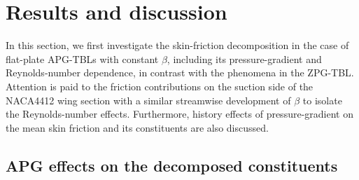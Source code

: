 


%
%

\section{Results and discussion}\label{result}
In this section, we first investigate the skin-friction decomposition in the case of  flat-plate APG-TBLs with constant $\beta$, including its pressure-gradient and Reynolds-number dependence, in contrast with the phenomena in the ZPG-TBL. Attention is paid to the friction contributions on the suction side of the NACA4412 wing  section with a similar streamwise development of $\beta$ to isolate the Reynolds-number effects.
Furthermore, history effects of pressure-gradient on the mean skin friction and its constituents are also discussed.

\subsection{APG effects on the decomposed constituents}\label{beta-eff}

